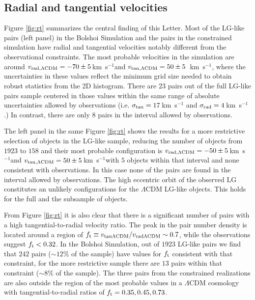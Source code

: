 \documentclass{emulateapj}
\newcommand{\kms}{\,km~s$^{-1}$}
\begin{document}
\subsection{Radial and tangential velocities}

Figure \ref{fig:rt} summarizes the central finding of this
Letter. Most of the LG-like pairs (left panel) in the Bolshoi
Simulation and the pairs in the constrained simulation have radial and
tangential velocities notably different from the observational
constraints.  The most probable velocities in the simulation are
around $v_{\rm rad,\Lambda CDM} = -70\pm5$\kms and $v_{\rm tan,\Lambda
  CDM} = 50\pm5$ \kms, where the uncertainties in these values reflect
the minimum grid size needed to obtain robust statistics from the 2D
histogram. There are $23$ pairs out of the full LG-like pairs sample
centered in those values within the same range of absolute
uncertainties allowed by observations (i.e. $\sigma_{\rm tan}=17$\kms
and $\sigma_{\rm rad}=4$\kms.) In contrast, there are only $8$ pairs
in the interval allowed by observations.  

The left panel in the same Figure \ref{fig:rt} shows the results for a
more restrictive selection of objects in the LG-like sample, reducing
the number of objects from  $1923$   to $158$ and their most probable
configuration is $v_{\rm rad,\Lambda CDM} = -50\pm5$\kms and $v_{\rm
  tan,\Lambda CDM} = 50\pm5$\kms with $5$ objects within that interval
and none consistent with observations. In this case none of the pairs
are found in the interval allowed by observations. The high eccentric
orbit of the observed LG  constitutes an unlikely configurations for
the $\Lambda$CDM LG-like objects. This holds for the full and the
subsample of objects.  


From Figure \ref{fig:rt} it is also clear that there is a significant
number of pairs with a high tangential-to-radial velocity ratio. The
peak in the pair number density is located around a region of $f_{\rm
  t}\equiv v_{\rm tan \Lambda CDM}/v_{\rm rad \Lambda CDM}\sim 0.7$,
while the observations suggest $f_{\rm t}<0.32$. In the Bolshoi
Simulation, out of $1923$ LG-like pairs we find that $242$ pairs
($\sim 12\%$ of the sample) have values for $f_{\rm t}$ consistent
with that constraint, for the more restrictive sample there are $13$
pairs within that constraint ($\sim 8\%$ of the sample). The three
pairs from the constrained realizations are also outside the region of
the most probable values in a $\Lambda$CDM cosmology with
tangential-to-radial ratios of $f_{\rm t}= 0.35, 0.45, 0.73$. 
\end{document}
